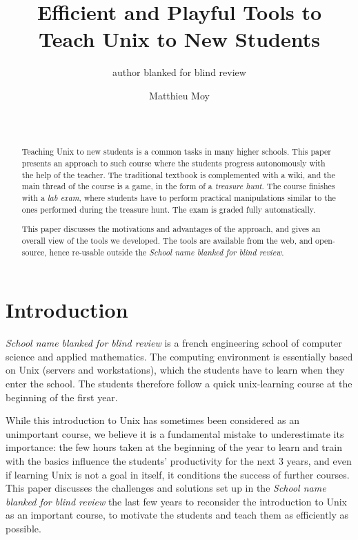 \documentclass{sig-alternate}
\author{author blanked for blind review}
\author{
\alignauthor
Matthieu Moy\\
\affaddr{Grenoble-INP (Ensimag), Verimag UMR 5104}\\
\affaddr{Grenoble, F-38041, France}\\
\email{Matthieu.Moy@grenoble-inp.fr}
}
\title{Efficient and Playful Tools to Teach Unix to New Students}
\newcommand{\ensimag}[0]{\textit{School name blanked for blind review}}
\newcommand{\ensimag}[0]{Ensimag}
\begin{document}
\maketitle

\begin{abstract}
  Teaching Unix to new students is a common tasks in many higher
  schools. This paper presents an approach to such course where the
  students progress autonomously with the help of the teacher. The
  traditional textbook is
  complemented with a wiki, and the main thread of the
  course is a game, in the form of a \emph{treasure hunt}. The course
  finishes with a \emph{lab exam}, where students have to perform
  practical manipulations similar to the ones performed during the
  treasure hunt. The exam is graded fully automatically.

  This paper discusses the motivations and advantages of the approach,
  and gives an overall view of the tools we developed. The tools are
  available from the web, and open-source, hence re-usable outside the
  \ensimag{}.
\end{abstract}




\section{Introduction}

\ensimag{} is a french engineering school of computer science and applied
mathematics. The computing environment is essentially based on Unix
(servers and workstations), which the students have to learn when they
enter the school. The students therefore follow a quick unix-learning
course at the beginning of the first year.

While this introduction to Unix has sometimes been considered as an
unimportant course, we believe it is a fundamental mistake to
underestimate its importance: the
few hours taken at the beginning of the year to learn and train with
the basics influence the students' productivity for the next 3 years,
and even if learning Unix is not a goal in itself, it conditions the
success of further courses. This paper discusses the challenges and
solutions set up in the \ensimag{} the last few years to reconsider the
introduction to Unix as an important course, to motivate the students
and teach them as efficiently as possible.
\end{document}
